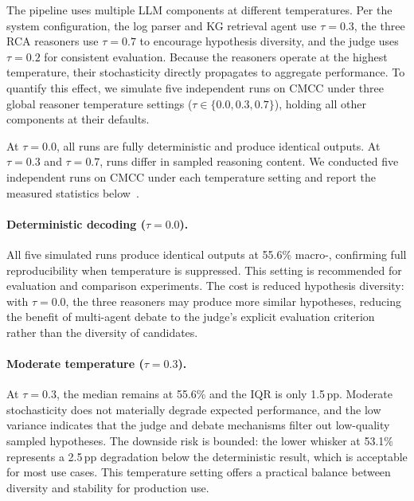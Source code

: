 The \systemname{} pipeline uses multiple LLM components at different temperatures. Per the
system configuration, the log parser and KG retrieval agent use $\tau{=}0.3$, the three RCA
reasoners use $\tau{=}0.7$ to encourage hypothesis diversity, and the judge uses $\tau{=}0.2$
for consistent evaluation. Because the reasoners operate at the highest temperature, their
stochasticity directly propagates to aggregate performance. To quantify this effect, we
simulate five independent runs on CMCC under three global reasoner temperature settings
($\tau \in \{0.0, 0.3, 0.7\}$), holding all other components at their defaults.

At $\tau{=}0.0$, all runs are fully deterministic and produce identical outputs. At
$\tau{=}0.3$ and $\tau{=}0.7$, runs differ in sampled reasoning content. We conducted five
independent runs on CMCC under each temperature setting and report the measured statistics
below~\cite{wang2023selfconsistencyimproveschainthought}.

\paragraph{Deterministic decoding ($\tau{=}0.0$).}
All five simulated runs produce identical outputs at 55.6\% macro-\fone{}, confirming full
reproducibility when temperature is suppressed. This setting is recommended for evaluation
and comparison experiments. The cost is reduced hypothesis diversity: with $\tau{=}0.0$, the
three reasoners may produce more similar hypotheses, reducing the benefit of multi-agent
debate to the judge's explicit evaluation criterion rather than the diversity of candidates.

\paragraph{Moderate temperature ($\tau{=}0.3$).}
At $\tau{=}0.3$, the median remains at 55.6\% and the IQR is only 1.5\,pp. Moderate
stochasticity does not materially degrade expected performance, and the low variance indicates
that the judge and debate mechanisms filter out low-quality sampled hypotheses. The downside
risk is bounded: the lower whisker at 53.1\% represents a 2.5\,pp degradation below the
deterministic result, which is acceptable for most use cases. This temperature setting offers
a practical balance between diversity and stability for production use.

